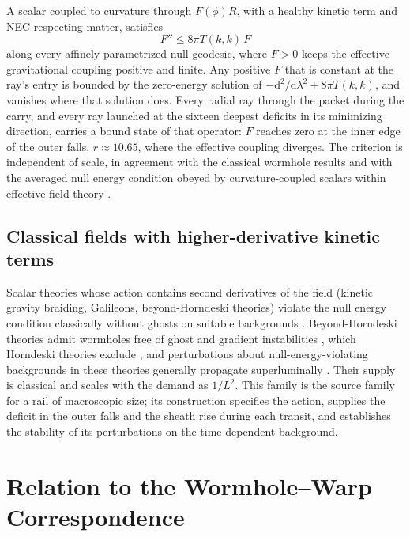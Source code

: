 \documentclass[11pt]{article}
\newcommand{\dd}{\mathrm{d}}
\begin{document}
A scalar coupled to curvature through $F(\phi)R$, with a healthy kinetic term and NEC-respecting matter, satisfies
\begin{equation}
F''\le8\pi T(k,k)\,F
\end{equation}
along every affinely parametrized null geodesic, where $F>0$ keeps the effective gravitational coupling positive and finite. Any positive $F$ that is constant at the ray's entry is bounded by the zero-energy solution of $-\dd^2/\dd\lambda^2+8\pi T(k,k)$, and vanishes where that solution does. Every radial ray through the packet during the carry, and every ray launched at the sixteen deepest deficits in its minimizing direction, carries a bound state of that operator: $F$ reaches zero at the inner edge of the outer falls, $r\approx10.65$, where the effective coupling diverges. The criterion is independent of scale, in agreement with the classical wormhole results \cite{BarceloVisser2000,Butcher2015} and with the averaged null energy condition obeyed by curvature-coupled scalars within effective field theory \cite{FlissFreivogelKontouPardoSantos2024}.

\subsection{Classical fields with higher-derivative kinetic terms}

Scalar theories whose action contains second derivatives of the field (kinetic gravity braiding, Galileons, beyond-Horndeski theories) violate the null energy condition classically without ghosts on suitable backgrounds \cite{DeffayetPujolasSawickiVikman2010,Rubakov2014}. Beyond-Horndeski theories admit wormholes free of ghost and gradient instabilities \cite{FrancioliniHuiPencoSantoniTrincherini2019}, which Horndeski theories exclude \cite{EvseevMelichev2018}, and perturbations about null-energy-violating backgrounds in these theories generally propagate superluminally \cite{DubovskyGregoireNicolisRattazzi2006}. Their supply is classical and scales with the demand as $1/L^2$. This family is the source family for a rail of macroscopic size; its construction specifies the action, supplies the deficit in the outer falls and the sheath rise during each transit, and establishes the stability of its perturbations on the time-dependent background.

\section{Relation to the Wormhole--Warp Correspondence}
\end{document}
